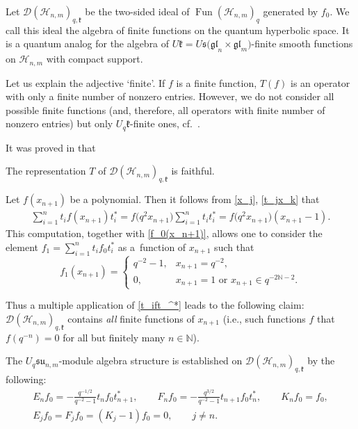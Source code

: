 \documentclass[pdftex]{sigma}
\begin{document}
Let $\mathscr{D}(\mathscr{H}_{n,m})_{q,\mathfrak{k}}$ be the two-sided ideal of
$\operatorname{Fun}(\mathscr{H}_{n,m})_q$ generated by $f_0$. We call this ideal the algebra of f\/inite
functions on the quantum hyperbolic space. It is a quantum analog for the algebra of $U \mathfrak{k}=U
\mathfrak{s(gl}_n \times \mathfrak{gl}_m)$-f\/inite smooth functions on $\mathscr{H}_{n,m}$ with compact
support.

\begin{remark}
Let us explain the adjective `f\/inite'. If $f$ is a f\/inite function, $T(f)$ is an operator with only a f\/inite
number of nonzero entries. However, we do not consider all possible f\/inite functions (and, therefore, all
operators with f\/inite number of nonzero entries) but only $U_q \mathfrak{k}$-f\/inite ones, cf.~\cite{Faraut}.
\end{remark}

It was proved in \cite{BS} that

\begin{theorem}
The representation $T$ of $\mathscr{D}(\mathscr{H}_{n,m})_{q,\mathfrak{k}}$ is faithful.
\end{theorem}

\begin{remark}\label{remark2}
Let $f(x_{n+1})$ be a polynomial. Then it follows from \eqref{x_j}, \eqref{t_jx_k} that
\begin{gather}\label{t_ift_^*}
\sum_{i=1}^nt_if(x_{n+1})t_i^*=f\big(q^2x_{n+1}\big)\sum_{i=1}^nt_it_i^*= f\big(q^2x_{n+1}\big)(x_{n+1}-1).
\end{gather}
This computation, together with \eqref{f_0(x_n+1)}, allows one to consider the element
$f_1=\sum\limits_{i=1}^nt_if_0t_i^*$ as a~function of $x_{n+1}$ such that
\[
f_1(x_{n+1})=
\begin{cases}
q^{-2}-1, & x_{n+1}=q^{-2},
\\ 0, & x_{n+1}=1\text{ \ or \ }x_{n+1}\in q^{-2\mathbb{N}-2}.
\end{cases}
\]

Thus a multiple application of \eqref{t_ift_^*} leads to the following claim:
$\mathscr{D}(\mathscr{H}_{n,m})_{q,\mathfrak{k}}$ contains {\it all} f\/inite functions of $x_{n+1}$ (i.e.,
such functions $f$ that $f(q^{-n})=0$ for all but f\/initely many $n\in\mathbb{N}$).
\end{remark}

The $U_{q}\mathfrak{su}_{n,m}$-module algebra structure is established on
$\mathscr{D}(\mathscr{H}_{n,m})_{q,\mathfrak{k}}$ by the following:
\begin{gather*}
E_nf_0 = -\frac{q^{-1/2}}{q^{-2}-1}t_nf_0t_{n+1}^*, \qquad F_nf_0 = -\frac{q^{3/2}}{q^{-2}-1}t_{n+1}f_0t_n^*,
\qquad K_nf_0 = f_0,
\\
E_jf_0 = F_jf_0=(K_j-1)f_0=0,\qquad j\ne n.
\end{gather*}
\end{document}
